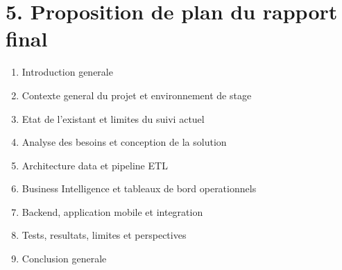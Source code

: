 \documentclass[12pt,a4paper]{article}
\begin{document}
\section*{5. Proposition de plan du rapport final}

\begin{enumerate}
    \item Introduction generale
    \item Contexte general du projet et environnement de stage
    \item Etat de l'existant et limites du suivi actuel
    \item Analyse des besoins et conception de la solution
    \item Architecture data et pipeline ETL
    \item Business Intelligence et tableaux de bord operationnels
    \item Backend, application mobile et integration
    \item Tests, resultats, limites et perspectives
    \item Conclusion generale
\end{enumerate}
\end{document}
